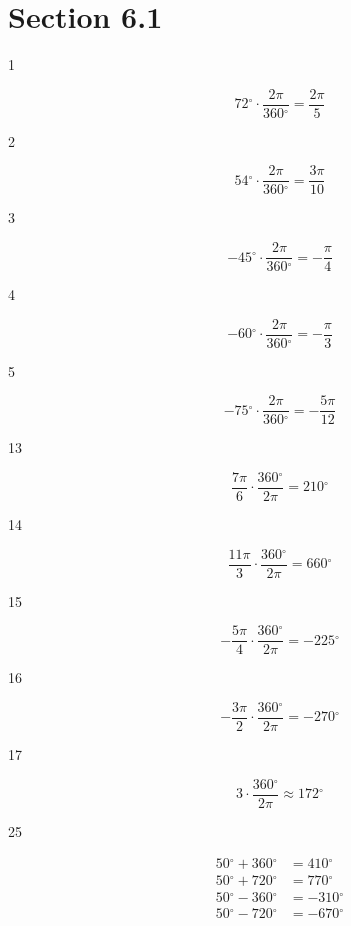 \documentclass{exam}
\newcommand{\degree}{\ensuremath{^\circ}}
\begin{document}
    \section{Section 6.1}
    \begin{description}
      \item[1] 
        \[
          72 \degree \cdot \frac{2 \pi}{360 \degree} = \boxed{ \frac{2 \pi}{5} }
        \]

      \item[2] 
        \[
          54 \degree \cdot \frac{2 \pi}{360 \degree} = \boxed{ \frac{3 \pi}{10} }
        \]

      \item[3] 
        \[
          -45 \degree \cdot \frac{2 \pi}{360 \degree} = \boxed{ -\frac{\pi}{4} }
        \]

      \item[4] 
        \[
          -60 \degree \cdot \frac{2 \pi}{360 \degree} = \boxed{ -\frac{\pi}{3} }
        \]

      \item[5] 
        \[
          -75 \degree \cdot \frac{2 \pi}{360 \degree} = \boxed{ -\frac{5 \pi}{12} }
        \]

      \item[13] 
        \[
          \frac{7 \pi}{6} \cdot \frac{360 \degree}{2 \pi} = \boxed{ 210 \degree }
        \]

      \item[14] 
        \[
          \frac{11 \pi}{3} \cdot \frac{360 \degree}{2 \pi} = \boxed{ 660 \degree }
        \]

      \item[15] 
        \[
          - \frac{5 \pi}{4} \cdot \frac{360 \degree}{2 \pi} = \boxed{ -225 \degree }
        \]

      \item[16] 
        \[
          - \frac{3 \pi}{2} \cdot \frac{360 \degree}{2 \pi} = \boxed{ -270 \degree }
        \]

      \item[17] 
        \[
          3 \cdot \frac{360 \degree}{2 \pi} \approx \boxed{ 172 \degree }
        \]

      \item[25] 
        \begin{align*}
          50 \degree + 360 \degree & = \boxed{ 410 \degree } \\
          50 \degree + 720 \degree & = \boxed{ 770 \degree } \\
          50 \degree - 360 \degree & = \boxed{ -310 \degree } \\
          50 \degree - 720 \degree & = \boxed{ -670 \degree } \\
        \end{align*}


\end{description}
\end{document}
